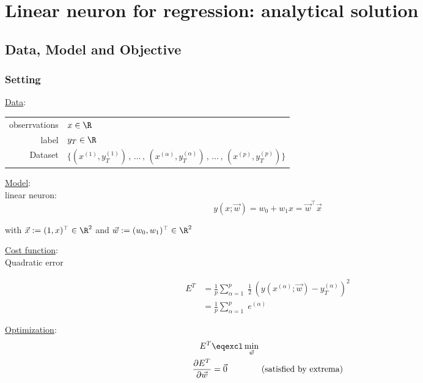 \section{Linear neuron for regression: analytical solution}

\subsection{Data, Model and Objective}

\begin{frame}\frametitle{Setting}

\underline{Data}:\\

\begin{table}[h]
\begin{tabular}{rl}
obserrvations & $x \in \R$ \\
label         & $y_{T} \in \R$ \\
Dataset       & 
$
\Big\{
	\left(x^{(1)}, y_T^{(1)} 
	\right)
	\,,\, \ldots \,,\,
	\left( x^{(\alpha)}, y_T^{(\alpha)} \right)
	\,,\, \ldots \,,\, 
	\left( x^{(p)}, y_T^{(p)} \right) 
\Big\}
$
\end{tabular}
\end{table}

\pause

\underline{Model}:\\

linear neuron:
\begin{equation}
    y(x; \vec w) = w_{0} + w_{1} x = \vec w^{\top} \vec x
\end{equation}

with $\vec x := (1, x)^{\top} \in \R^{2}$ and $\vec w := (w_{0}, w_{1})^{\top} \in \R^{2}$

\end{frame}

\begin{frame}

\underline{Cost function}:\\

Quadratic error

\begin{align}
E^{T} &= \frac{1}{p} \sum_{\alpha=1}^{p} \;
\frac{1}{2} \, \left( y(x^{(\alpha)}; \vec w)- y^{(\alpha)}_{T}\right)^{2}\\
&= \frac{1}{p} \sum_{\alpha=1}^{p}
\;e^{(\alpha)}
\end{align}


\pause

\underline{Optimization}:\\

\begin{align}
E^{T} &\eqexcl \min_{\vec w}\\
\frac{\partial E^{T}}{\partial \vec w} &= \vec 0 \qquad\qquad \text{(satisfied by extrema)}
\label{eq:extremacond}
\end{align}
    
\end{frame}

